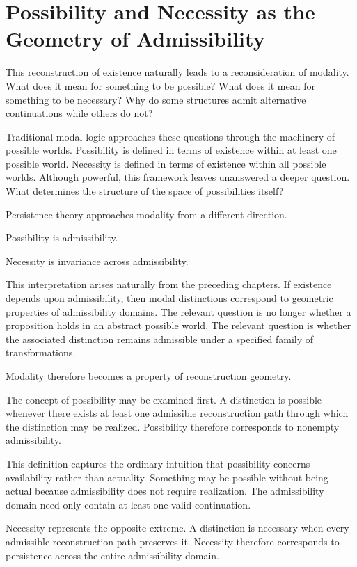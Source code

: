 \documentclass[12pt,oneside]{article}
\theoremstyle{definition}
\begin{document}
\section{Possibility and Necessity as the Geometry of Admissibility}

This reconstruction of existence naturally leads to a reconsideration of modality. What does it mean for something to be possible? What does it mean for something to be necessary? Why do some structures admit alternative continuations while others do not?

Traditional modal logic approaches these questions through the machinery of possible worlds. Possibility is defined in terms of existence within at least one possible world. Necessity is defined in terms of existence within all possible worlds. Although powerful, this framework leaves unanswered a deeper question. What determines the structure of the space of possibilities itself?

Persistence theory approaches modality from a different direction.

Possibility is admissibility.

Necessity is invariance across admissibility.

This interpretation arises naturally from the preceding chapters. If existence depends upon admissibility, then modal distinctions correspond to geometric properties of admissibility domains. The relevant question is no longer whether a proposition holds in an abstract possible world. The relevant question is whether the associated distinction remains admissible under a specified family of transformations.

Modality therefore becomes a property of reconstruction geometry.

The concept of possibility may be examined first. A distinction is possible whenever there exists at least one admissible reconstruction path through which the distinction may be realized. Possibility therefore corresponds to nonempty admissibility.

This definition captures the ordinary intuition that possibility concerns availability rather than actuality. Something may be possible without being actual because admissibility does not require realization. The admissibility domain need only contain at least one valid continuation.

Necessity represents the opposite extreme. A distinction is necessary when every admissible reconstruction path preserves it. Necessity therefore corresponds to persistence across the entire admissibility domain.
\end{document}
